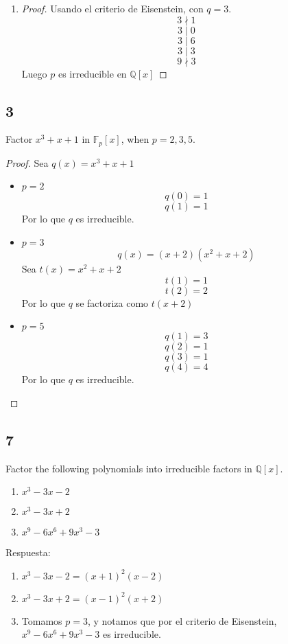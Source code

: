 \documentclass[11pt]{article}
\newcommand{\set}[1]{\mathbb{#1}}
\theoremstyle{definition}
\begin{document}
\begin{enumerate}[label=\textbf{(\alph*)}]
        \item \begin{proof}
            Usando el criterio de Eisenstein, con $q=3$.
            \[3\nmid 1\]
            \[3\mid 0\]
            \[3\mid 6\]
            \[3\mid 3\]
            \[9\nmid 3\]
            Luego $p$ es irreducible en $\set{Q}[x]$
        \end{proof}
    \end{enumerate}

    \subsection{3}
    Factor $x^3+x+1$ in $\set{F}_p[x]$, when $p=2,3,5$.
    \begin{proof}
        Sea $q(x)=x^3+x+1$
        \begin{itemize}
            \item $p=2$
            \[q(0)=1\]
            \[q(1)=1\]
            Por lo que $q$ es irreducible.

            \item $p=3$
            \[q(x)=(x+2)(x^2+x+2)\]
            Sea $t(x)=x^2+x+2$
            \[t(1)=1\]
            \[t(2)=2\]
            Por lo que $q$ se factoriza como $t(x+2)$

            \item $p=5$
            \[q(1)=3\]
            \[q(2)=1\]
            \[q(3)=1\]
            \[q(4)=4\]
            Por lo que $q$ es irreducible.
        \end{itemize}
    \end{proof}

    \subsection{7}
    Factor the following polynomials into irreducible factors in $\set{Q}[x]$.
    \begin{enumerate}[label=\textbf{(\alph*)}]
        \item $x^3-3x-2$

        \item $x^3-3x+2$

        \item $x^9-6x^6+9x^3-3$
    \end{enumerate}
    Respuesta:
    \begin{enumerate}[label=\textbf{(\alph*)}]
            \item $x^3-3x-2=(x+1)^2(x-2)$

            \item $x^3-3x+2=(x-1)^2(x+2)$

            \item Tomamos $p=3$, y notamos que por el criterio de Eisenstein, $x^9-6x^6+9x^3-3$ es irreducible.
    \end{enumerate}
    
\end{document}
